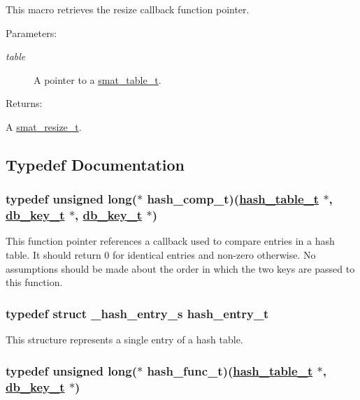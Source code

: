 This macro retrieves the resize callback function pointer.\begin{Desc}
\item[Parameters: ]\par
\begin{description}
\item[{\em 
table}]A pointer to a \hyperlink{group__dbprim__smat_a0}{smat\_\-table\_\-t}.\end{description}
\end{Desc}
\begin{Desc}
\item[Returns: ]\par
A \hyperlink{group__dbprim__smat_a3}{smat\_\-resize\_\-t}. \end{Desc}


\subsection{Typedef Documentation}
\hypertarget{group__dbprim__hash_a4}{
\subsubsection[hash\_\-comp\_\-t]{\setlength{\rightskip}{0pt plus 5cm}typedef unsigned long($\ast$ hash\_\-comp\_\-t)(\hyperlink{group__dbprim__hash_a0}{hash\_\-table\_\-t} $\ast$, \hyperlink{group__dbprim_a0}{db\_\-key\_\-t} $\ast$, \hyperlink{group__dbprim_a0}{db\_\-key\_\-t} $\ast$)}}
\label{group__dbprim__hash_a4}


This function pointer references a callback used to compare entries in a hash table. It should return 0 for identical entries and non-zero otherwise. No assumptions should be made about the order in which the two keys are passed to this function. \hypertarget{group__dbprim__hash_a1}{
\subsubsection[hash\_\-entry\_\-t]{\setlength{\rightskip}{0pt plus 5cm}typedef struct \_\-hash\_\-entry\_\-s hash\_\-entry\_\-t}}
\label{group__dbprim__hash_a1}


This structure represents a single entry of a hash table. \hypertarget{group__dbprim__hash_a3}{
\subsubsection[hash\_\-func\_\-t]{\setlength{\rightskip}{0pt plus 5cm}typedef unsigned long($\ast$ hash\_\-func\_\-t)(\hyperlink{group__dbprim__hash_a0}{hash\_\-table\_\-t} $\ast$, \hyperlink{group__dbprim_a0}{db\_\-key\_\-t} $\ast$)}}
\label{group__dbprim__hash_a3}


